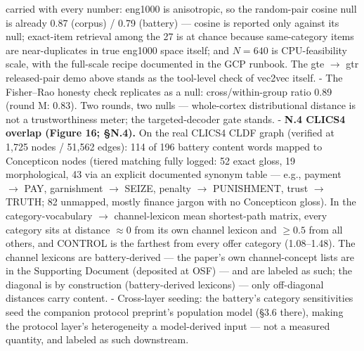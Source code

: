 \documentclass[
]{article}
\begin{document}
\begin{itemize}
  carried with every number: eng1000 is anisotropic, so the random-pair
  cosine null is already 0.87 (corpus) / 0.79 (battery) --- cosine is
  reported only against its null; exact-item retrieval among the 27 is
  at chance because same-category items are near-duplicates in true
  eng1000 space itself; and \(N = 640\) is CPU-feasibility scale, with
  the full-scale recipe documented in the GCP runbook. The gte \(\to\)
  gtr released-pair demo above stands as the tool-level check of vec2vec
  itself. - The Fisher--Rao honesty check replicates as a null:
  cross/within-group ratio 0.89 (round M: 0.83). Two rounds, two nulls
  --- whole-cortex distributional distance is not a trustworthiness
  meter; the targeted-decoder gate stands. - \textbf{N.4 CLICS4 overlap
  (Figure 16; §N.4).} On the real CLICS4 CLDF graph (verified at 1,725
  nodes / 51,562 edges): 114 of 196 battery content words mapped to
  Concepticon nodes (tiered matching fully logged: 52 exact gloss, 19
  morphological, 43 via an explicit documented synonym table --- e.g.,
  payment \(\to\) PAY, garnishment \(\to\) SEIZE, penalty \(\to\)
  PUNISHMENT, trust \(\to\) TRUTH; 82 unmapped, mostly finance jargon
  with no Concepticon gloss). In the category-vocabulary \(\to\)
  channel-lexicon mean shortest-path matrix, every category sits at
  distance \(\approx 0\) from its own channel lexicon and \(\geq 0.5\)
  from all others, and CONTROL is the farthest from every offer category
  (1.08--1.48). The channel lexicons are battery-derived --- the paper's
  own channel-concept lists are in the Supporting Document (deposited at
  OSF) --- and are labeled as such; the diagonal is by construction
  (battery-derived lexicons) --- only off-diagonal distances carry
  content. - Cross-layer seeding: the battery's category sensitivities
  seed the companion protocol preprint's population model (§3.6 there),
  making the protocol layer's heterogeneity a model-derived input ---
  not a measured quantity, and labeled as such downstream.
\end{itemize}
\end{document}
